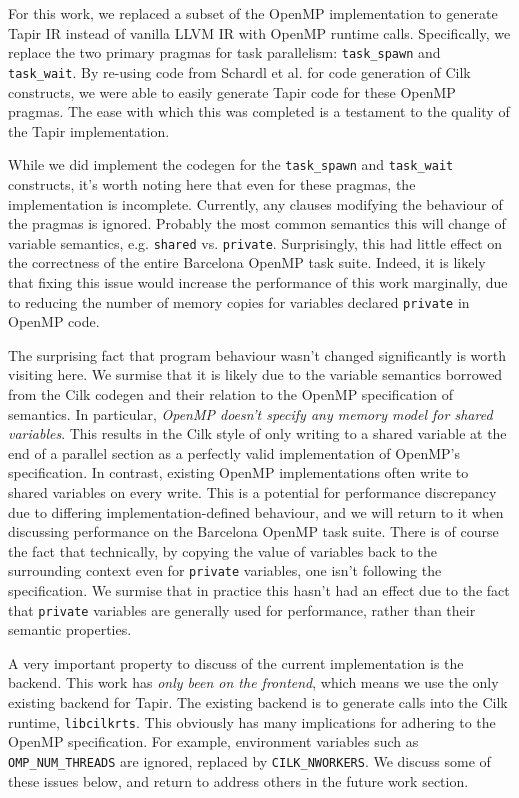 \documentclass[sigconf]{acmart}
\begin{document}
For this work, we replaced a subset of the OpenMP implementation to generate
Tapir IR instead of vanilla LLVM IR with OpenMP runtime calls. Specifically, we
replace the two primary pragmas for task parallelism: \texttt{task\_spawn} and
\texttt{task\_wait}. By re-using code from Schardl et al. for code generation
of Cilk constructs, we were able to easily generate Tapir code for these OpenMP
pragmas. The ease with which this was completed is a testament to the quality of
the Tapir implementation. 

While we did implement the codegen for the \texttt{task\_spawn} and
\texttt{task\_wait} constructs, it's worth noting here that even for these
pragmas, the implementation is incomplete. Currently, any clauses modifying the 
behaviour of the pragmas is ignored. Probably the most common semantics this
will change of variable semantics, e.g. \texttt{shared} vs. \texttt{private}.
Surprisingly, this had little effect on the correctness of the entire Barcelona
OpenMP task suite. Indeed, it is likely that fixing this issue would increase
the performance of this work marginally, due to reducing the number of memory
copies for variables declared \texttt{private} in OpenMP code. 

The surprising fact that program behaviour wasn't changed significantly is
worth visiting here. We surmise that it is likely due to the variable semantics
borrowed from the Cilk codegen and their relation to the OpenMP specification
of semantics.  In particular, \emph{OpenMP doesn't specify any memory model for
shared variables}. This results in the Cilk style of only writing to a shared
variable at the end of a parallel section as a perfectly valid implementation
of OpenMP's specification. In contrast, existing OpenMP implementations often
write to shared variables on every write. This is a potential for performance
discrepancy due to differing implementation-defined behaviour, and we will 
return to it when discussing performance on the Barcelona OpenMP task suite.
There is of course the fact that technically, by copying the value of variables
back to the surrounding context even for \texttt{private} variables, one isn't
following the specification. We surmise that in practice this hasn't had an
effect due to the fact that \texttt{private} variables are generally used for
performance, rather than their semantic properties. 

A very important property to discuss of the current implementation is the
backend. This work has \emph{only been on the frontend}, which means we use
the only existing backend for Tapir. The existing backend is to generate 
calls into the Cilk runtime, \texttt{libcilkrts}. This obviously has many 
implications for adhering to the OpenMP specification. For example, environment
variables such as \texttt{OMP\_NUM\_THREADS} are ignored, replaced by
\texttt{CILK\_NWORKERS}. We discuss some of these issues below, and return to 
address others in the future work section. 
\end{document}
